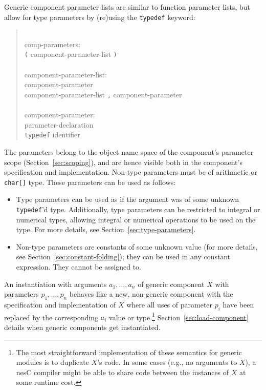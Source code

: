 \documentclass[11pt,letterpaper]{article}
\newcommand{\kw}[1]{{\tt #1}}
\newcommand{\code}[1]{{\tt #1}}
\newcommand{\nesc}{nesC\xspace}
\newcommand{\grammarshift}{\vspace*{-.7cm}}
\newcommand{\grammarindent}{\hspace*{2cm}\= \\ \kill}
\begin{document}
Generic component parameter lists are similar to function parameter lists,
but allow for type parameters by (re)using the \kw{typedef} keyword:
\begin{quote} \grammarshift \em \begin{tabbing}
\grammarindent
comp-parameters:\\
\>	\kw{(} component-parameter-list \kw{)}\\
\\
component-parameter-list:\\
\>	component-parameter\\
\>	component-parameter-list \kw{,} component-parameter\\
\\
component-parameter:\\
\>	parameter-declaration\\
\>	\kw{typedef} identifier
\end{tabbing} \end{quote}
The parameters belong to the object name space of the component's parameter
scope (Section~\ref{sec:scoping}), and are hence visible both in the
component's specification and implementation. Non-type parameters must be
of arithmetic or \code{char[]} type. These parameters can be used as
follows:
\begin{itemize}
\item Type parameters can be used as if the argument was of some unknown
\kw{typedef}'d type. Additionally, type parameters can be restricted to
integral or numerical types, allowing integral or numerical operations to
be used on the type. For more details, see
Section~\ref{sec:type-parameters}.
\item Non-type parameters are constants of some unknown value (for more
details, see Section~\ref{sec:constant-folding}); they can be used in any
constant expression. They cannot be assigned to.
\end{itemize}

An instantiation with arguments $a_1, \ldots, a_n$ of generic component $X$
with parameters $p_1, \ldots, p_n$ behaves like a new, non-generic component
with the specification and implementation of $X$ where all uses of
parameter $p_i$ have been replaced by the corresponding $a_i$ value or
type.\footnote{The most straightforward implementation of these semantics
for generic modules is to duplicate $X$'s code. In some cases (e.g., no
arguments to $X$), a \nesc compiler might be able to share code between the
instances of $X$ at some runtime cost.} Section~\ref{sec:load-component}
details when generic components get instantiated.
\end{document}
